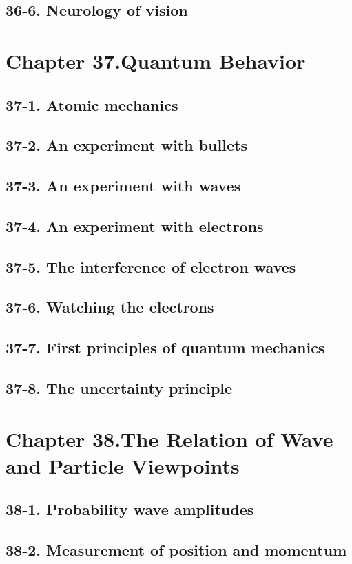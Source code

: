 \documentclass{article}
\begin{document}
\subsection{36-6. Neurology of vision}
\section{Chapter 37.Quantum Behavior}
\subsection{37-1. Atomic mechanics}
\subsection{37-2. An experiment with bullets}
\subsection{37-3. An experiment with waves}
\subsection{37-4. An experiment with electrons}
\subsection{37-5. The interference of electron waves}
\subsection{37-6. Watching the electrons}
\subsection{37-7. First principles of quantum mechanics}
\subsection{37-8. The uncertainty principle}
\section{Chapter 38.The Relation of Wave and Particle Viewpoints}
\subsection{38-1. Probability wave amplitudes}
\subsection{38-2. Measurement of position and momentum}
\end{document}
